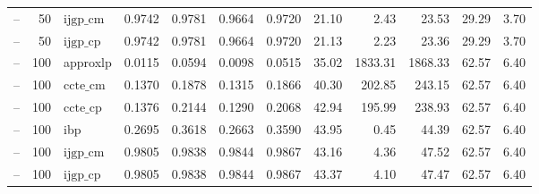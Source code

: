 \begin{table}[ht]
\begin{tabular}{lrlrrrrrrrrr}
-- & 50 & $\text{ijgp\_cm}$ & 0.9742 & 0.9781 & 0.9664 & 0.9720 & 21.10 & 2.43 & 23.53 & 29.29 & 3.70 \\
-- & 50 & $\text{ijgp\_cp}$ & 0.9742 & 0.9781 & 0.9664 & 0.9720 & 21.13 & 2.23 & 23.36 & 29.29 & 3.70 \\
-- & 100 & approxlp & 0.0115 & 0.0594 & 0.0098 & 0.0515 & 35.02 & 1833.31 & 1868.33 & 62.57 & 6.40 \\
-- & 100 & $\text{ccte\_cm}$ & 0.1370 & 0.1878 & 0.1315 & 0.1866 & 40.30 & 202.85 & 243.15 & 62.57 & 6.40 \\
-- & 100 & $\text{ccte\_cp}$ & 0.1376 & 0.2144 & 0.1290 & 0.2068 & 42.94 & 195.99 & 238.93 & 62.57 & 6.40 \\
-- & 100 & ibp & 0.2695 & 0.3618 & 0.2663 & 0.3590 & 43.95 & 0.45 & 44.39 & 62.57 & 6.40 \\
-- & 100 & $\text{ijgp\_cm}$ & 0.9805 & 0.9838 & 0.9844 & 0.9867 & 43.16 & 4.36 & 47.52 & 62.57 & 6.40 \\
-- & 100 & $\text{ijgp\_cp}$ & 0.9805 & 0.9838 & 0.9844 & 0.9867 & 43.37 & 4.10 & 47.47 & 62.57 & 6.40 \\
\bottomrule
\end{tabular}
\end{table}
